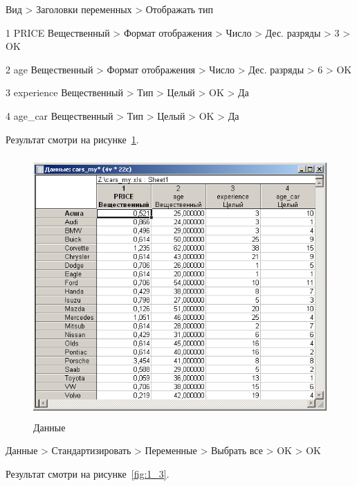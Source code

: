Вид > Заголовки переменных > Отображать тип

1 PRICE Вещественный > Формат отображения > Число > Дес. разряды > 3 > OK

2 age Вещественный > Формат отображения > Число > Дес. разряды > 6 > OK

3 experience Вещественный > Тип > Целый > OK > Да

4 age\_car Вещественный > Тип > Целый > OK > Да

Результат смотри на рисунке~\ref{fig:1_2}.

\begin{figure}[!h]
  \centering

  \includegraphics[height=10cm]
  {inc/cars_my/1.2.PNG}

  \caption{Данные}

  \label{fig:1_2}
\end{figure}

\newpage

Данные > Стандартизировать > Переменные > Выбрать все > OK > OK

Результат смотри на рисунке~\ref{fig:1_3}.

